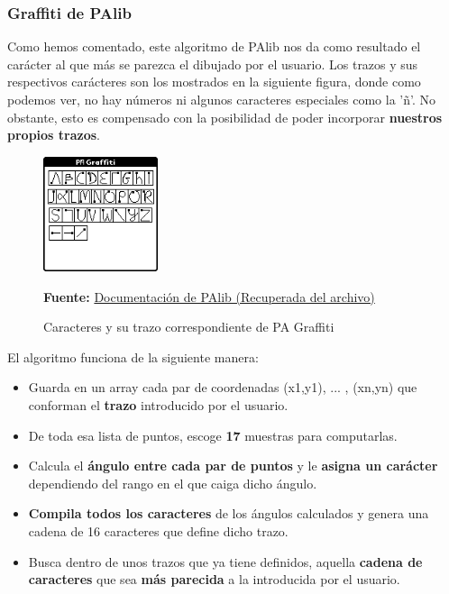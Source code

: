 \vspace{0.5cm}

\subsubsection{Graffiti de PAlib}

Como hemos comentado, este algoritmo de PAlib nos da como resultado el carácter al que más se parezca el dibujado por el usuario. Los trazos y sus respectivos carácteres son los mostrados en la siguiente figura, donde como podemos ver, no hay números ni algunos caracteres especiales como la 'ñ'. No obstante, esto es compensado con la posibilidad de poder incorporar \textbf{nuestros propios trazos}. 

\vspace{0.5cm}

\begin{figure}[htbp]
\centering
  \includegraphics[width=0.3\textwidth]{archivos/pagraffiti.png}
  \caption{Caracteres y su trazo correspondiente de PA Graffiti}
  \textbf{Fuente:} \href{https://web.archive.org/web/20070708175646/http://www.palib.info/Reco/PAGraffiti.gif}{Documentación de PAlib (Recuperada del archivo)}
  \label{fig:pagraffiti}
\end{figure}

\vspace{0.5cm}

El algoritmo funciona de la siguiente manera: 

\vspace{0.5cm}

\begin{itemize}
 \item Guarda en un array cada par de coordenadas (x1,y1), ... , (xn,yn) que conforman el \textbf{trazo} introducido por el usuario.
 
 \item De toda esa lista de puntos, escoge \textbf{17} muestras para computarlas. 
 
 \item Calcula el \textbf{ángulo entre cada par de puntos} y le \textbf{asigna un carácter} dependiendo del rango en el que caiga dicho ángulo.
 
 \item \textbf{Compila todos los caracteres} de los ángulos calculados y genera una cadena de 16 caracteres que define dicho trazo.
 
 \item Busca dentro de unos trazos que ya tiene definidos, aquella \textbf{cadena de caracteres} que sea \textbf{más parecida} a la introducida por el usuario.
\end{itemize}

